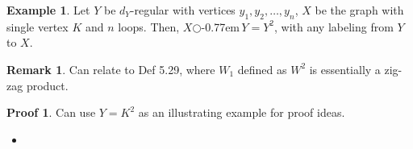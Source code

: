 \documentclass{book}
\newcommand{\zigzag}{$\bigcirc$\kern-0.77em\raisebox{-.16ex}{\small Z}$\,$}
\theoremstyle{definition}
\theoremstyle{remarkstyle}
\newtheorem*{remark}{Remark}%
\newtheorem*{example}{Example}%
\newtheorem*{myproof}{Proof}%
\begin{document}
\begin{example}
    Let $Y$ be $d_Y$-regular with vertices $y_1, y_2, \dots, y_n$, $X$ be the graph with single vertex $K$ and $n$ loops. Then, $X$\zigzag$Y=Y^2$, with any labeling from $Y$ to $X$.
\end{example}
\begin{remark}
    Can relate to Def 5.29, where $W_1$ defined as $W^2$ is essentially a zig-zag product.
\end{remark}
\begin{myproof}
Can use $Y=K^2$ as an illustrating example for proof ideas.
\begin{itemize}
    \item 
\end{itemize}
\end{myproof}
\end{document}
